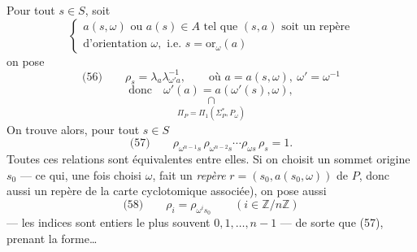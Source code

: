 \documentclass[11pt,a4paper]{article}
\begin{document}
Pour tout $s \in S$, soit
\[
  \left\{
  \begin{array}{l}
    a(s, \omega) \text{ ou } a(s) \in A \text{ tel que } (s, a) \text{ soit un repère} \\
    \text{d'orientation } \omega, \text{ i.e.\ } s = \mathrm{or}_\omega(a)
  \end{array}
  \right.
\]
on pose
\[
  \text{(56)} \qquad \rho_s = \lambda_a \lambda_{\omega' a}^{-1} ,
  \qquad \text{où } a = a(s, \omega) ,\ \omega' = \omega^{-1}
\]
\[
  \text{donc} \quad \omega'(a) = a(\omega'(s), \omega) ,
\]
\[
  \underset{\Pi_P = \Pi_1(\Sigma_P^{*}, P_\omega)}{\cap}
\]
On trouve alors, pour tout $s \in S$
\[
  \text{(57)} \qquad \rho_{\omega^{n-1}s}\, \rho_{\omega^{n-2}s} \cdots
  \rho_{\omega s}\, \rho_s = 1 .
\]
Toutes ces  relations sont équivalentes entre elles. Si on choisit un
sommet origine $s_0$ --- ce qui, une fois choisi $\omega$, fait un \emph{repère}
 $r = (s_0, a(s_0, \omega))$ de $P$, donc aussi un repère de la carte
cyclotomique associée), on pose aussi
\[
  \text{(58)} \qquad \rho_i = \rho_{\omega^i s_0}
  \qquad (i \in \mathbb{Z}/n\mathbb{Z})
\]
--- les indices sont entiers le plus souvent $0, 1, \ldots, n-1$ ---
de sorte que (57), prenant la forme…
\end{document}
